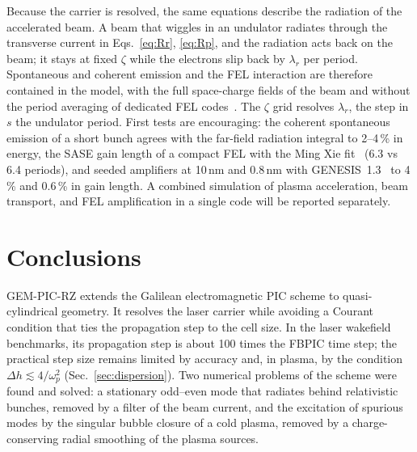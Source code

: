 \documentclass[preprint,12pt]{elsarticle}
\begin{document}
Because the carrier is resolved, the same equations describe the radiation of the accelerated beam. A beam that wiggles in an undulator radiates through the transverse current in Eqs.~\eqref{eq:Rr}, \eqref{eq:Rp}, and the radiation acts back on the beam; it stays at fixed $\zeta$ while the electrons slip back by $\lambda_r$ per period. Spontaneous and coherent emission and the FEL interaction are therefore contained in the model, with the full space-charge fields of the beam and without the period averaging of dedicated FEL codes~\cite{Reiche1999}. The $\zeta$ grid resolves $\lambda_r$, the step in $s$ the undulator period. First tests are encouraging: the coherent spontaneous emission of a short bunch agrees with the far-field radiation integral to 2--4\,\% in energy, the SASE gain length of a compact FEL with the Ming Xie fit~\cite{Xie1995} (6.3 vs 6.4 periods), and seeded amplifiers at 10\,nm and 0.8\,nm with GENESIS~1.3~\cite{Reiche1999} to 4\,\% and 0.6\,\% in gain length. A combined simulation of plasma acceleration, beam transport, and FEL amplification in a single code will be reported separately.

\section{Conclusions}\label{sec:concl}

GEM-PIC-RZ extends the Galilean electromagnetic PIC scheme to quasi-cylindrical geometry. It resolves the laser carrier while avoiding a Courant condition that ties the propagation step to the cell size. In the laser wakefield benchmarks, its propagation step is about 100 times the FBPIC time step; the practical step size remains limited by accuracy and, in plasma, by the condition $\Delta h \lesssim 4/\omega_p^2$ (Sec.~\ref{sec:dispersion}). Two numerical problems of the scheme were found and solved: a stationary odd--even mode that radiates behind relativistic bunches, removed by a filter of the beam current, and the excitation of spurious modes by the singular bubble closure of a cold plasma, removed by a charge-conserving radial smoothing of the plasma sources.
\end{document}
